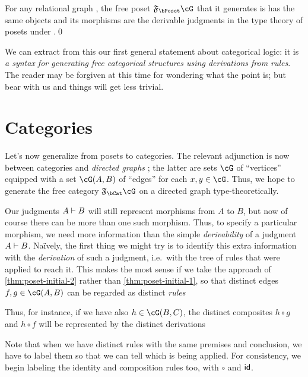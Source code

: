 \begin{thm}\label{thm:poset-initial-2}
  For any relational graph \cG, the free poset $\F{\bPoset}\cG$ that it generates is has the same objects and its morphisms are the derivable judgments in the type theory of posets under \cG.\qed
\end{thm}

We can extract from this our first general statement about categorical logic: it is \emph{a syntax for generating free categorical structures using derivations from rules}.
The reader may be forgiven at this time for wondering what the point is; but bear with us and things will get less trivial.


\section{Categories}
\label{sec:categories}

Let's now generalize from posets to categories.
The relevant adjunction is now between categories \bCat and \emph{directed graphs} \bGr; the latter are sets $\cG$ of ``vertices'' equipped with a set $\cG(A,B)$ of ``edges'' for each $x,y\in \cG$.
Thus, we hope to generate the free category $\F{\bCat}\cG$ on a directed graph \cG type-theoretically.

Our judgments $A\vdash B$ will still represent morphisms from $A$ to $B$, but now of course there can be more than one such morphism.
Thus, to specify a particular morphism, we need more information than the simple \emph{derivability} of a judgment $A\vdash B$.
Na\"ively, the first thing we might try is to identify this extra information with the \emph{derivation} of such a judgment, i.e.\ with the tree of rules that were applied to reach it.
This makes the most sense if we take the approach of \cref{thm:poset-initial-2} rather than \cref{thm:poset-initial-1}, so that distinct edges $f,g\in \cG(A,B)$ can be regarded as distinct \emph{rules}
Thus, for instance, if we have also $h\in \cG(B,C)$, the distinct composites $h\circ g$ and $h\circ f$ will be represented by the distinct derivations
Note that when we have distinct rules with the same premises and conclusion, we have to label them so that we can tell which is being applied.
For consistency, we begin labeling the identity and composition rules too, with $\circ$ and $\mathsf{id}$.

